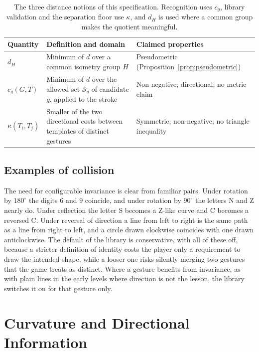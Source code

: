 \begin{table}[t]
\centering
\small
\begin{tabularx}{\textwidth}{@{}lXX@{}}
\toprule
Quantity & Definition and domain & Claimed properties \\
\midrule
$d_H$ & Minimum of $d$ over a common isometry group $H$ & Pseudometric (Proposition~\ref{prop:pseudometric}) \\
$c_g(G,T)$ & Minimum of $d$ over the allowed set $\mathcal S_g$ of candidate $g$, applied to the stroke & Non-negative; directional; no metric claim \\
$\kappa(T_i,T_j)$ & Smaller of the two directional costs between templates of distinct gestures & Symmetric; non-negative; no triangle inequality \\
\bottomrule
\end{tabularx}
\caption{The three distance notions of this specification. Recognition uses $c_g$, library validation and the separation floor use $\kappa$, and $d_H$ is used where a common group makes the quotient meaningful.}
\label{tab:distance-notions}
\end{table}

\section{Examples of collision}

The need for configurable invariance is clear from familiar pairs. Under rotation by $180^\circ$ the digits $6$ and $9$ coincide, and under rotation by $90^\circ$ the letters N and Z nearly do. Under reflection the letter S becomes a Z-like curve and C becomes a reversed C. Under reversal of direction a line from left to right is the same path as a line from right to left, and a circle drawn clockwise coincides with one drawn anticlockwise. The default of the library is conservative, with all of these off, because a stricter definition of identity costs the player only a requirement to draw the intended shape, while a looser one risks silently merging two gestures that the game treats as distinct. Where a gesture benefits from invariance, as with plain lines in the early levels where direction is not the lesson, the library switches it on for that gesture only.

\chapter{Curvature and Directional Information}\label{ch:curvature}

